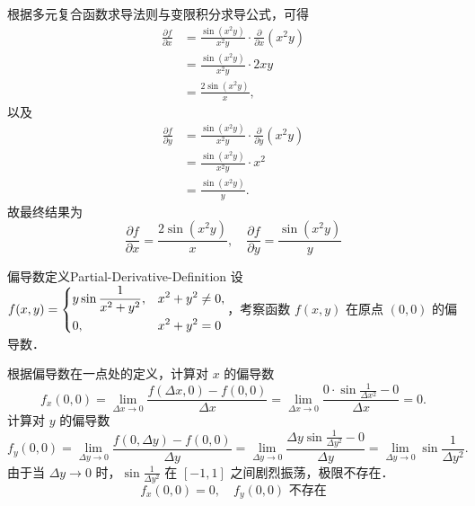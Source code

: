 \begin{solution}
    根据多元复合函数求导法则与变限积分求导公式，可得
    \begin{equation}
        \begin{aligned}
            \frac{\partial f}{\partial x} & = \frac{\sin(x^2 y)}{x^2 y} \cdot \frac{\partial}{\partial x}(x^2 y) \\
                                          & = \frac{\sin(x^2 y)}{x^2 y} \cdot 2xy                                \\
                                          & = \frac{2 \sin(x^2 y)}{x},
        \end{aligned}
    \end{equation}
    以及
    \begin{equation}
        \begin{aligned}
            \frac{\partial f}{\partial y} & = \frac{\sin(x^2 y)}{x^2 y} \cdot \frac{\partial}{\partial y}(x^2 y) \\
                                          & = \frac{\sin(x^2 y)}{x^2 y} \cdot x^2                                \\
                                          & = \frac{\sin(x^2 y)}{y}.
        \end{aligned}
    \end{equation}
    故最终结果为
    \begin{equation}
        \boxed{\frac{\partial f}{\partial x} = \frac{2 \sin(x^2 y)}{x}, \quad \frac{\partial f}{\partial y} = \frac{\sin(x^2 y)}{y}}
    \end{equation}
\end{solution}


\begin{problem}{偏导数定义}{Partial-Derivative-Definition}
    设 $f(x, y) = \begin{dcases} y \sin \frac{1}{x^2+y^2}, & x^2 + y^2 \neq 0, \\ 0, & x^2 + y^2 = 0 \end{dcases}$，考察函数 $f(x, y)$ 在原点 $(0, 0)$ 的偏导数．
\end{problem}

\begin{solution}
    根据偏导数在一点处的定义，计算对 $x$ 的偏导数
    \begin{equation}
        f_x(0, 0) = \lim_{\Delta x \to 0} \frac{f(\Delta x, 0) - f(0, 0)}{\Delta x} = \lim_{\Delta x \to 0} \frac{0 \cdot \sin \frac{1}{\Delta x^2} - 0}{\Delta x} = 0.
    \end{equation}
    计算对 $y$ 的偏导数
    \begin{equation}
        f_y(0, 0) = \lim_{\Delta y \to 0} \frac{f(0, \Delta y) - f(0, 0)}{\Delta y} = \lim_{\Delta y \to 0} \frac{\Delta y \sin \frac{1}{\Delta y^2} - 0}{\Delta y} = \lim_{\Delta y \to 0} \sin \frac{1}{\Delta y^2}.
    \end{equation}
    由于当 $\Delta y \to 0$ 时，$\sin \frac{1}{\Delta y^2}$ 在 $[-1, 1]$ 之间剧烈振荡，极限不存在．
    \begin{equation}
        \boxed{f_x(0, 0) = 0, \quad f_y(0, 0) \text{ 不存在}}
    \end{equation}
\end{solution}



